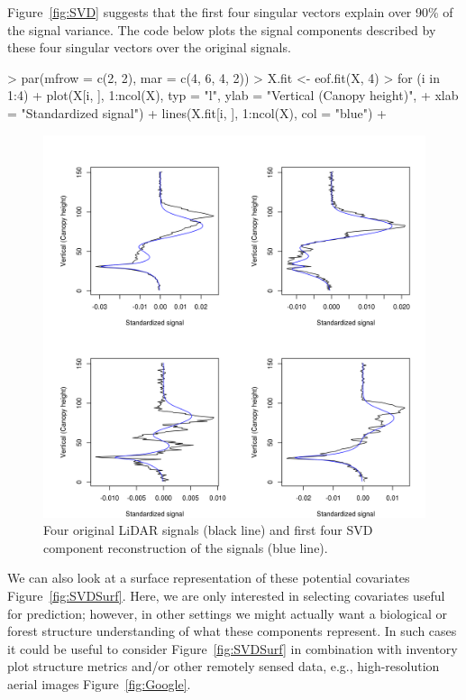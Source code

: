 \documentclass{article}
\begin{document}
Figure~\ref{fig:SVD} suggests that the first four singular vectors explain over 90\% of the signal variance. The code below plots the signal components described by these four singular vectors over the original signals.

\begin{Schunk}
\begin{Sinput}
> par(mfrow = c(2, 2), mar = c(4, 6, 4, 2))
> X.fit <- eof.fit(X, 4)
> for (i in 1:4) {
+     plot(X[i, ], 1:ncol(X), typ = "l", ylab = "Vertical (Canopy height)", 
+         xlab = "Standardized signal")
+     lines(X.fit[i, ], 1:ncol(X), col = "blue")
+ }
\end{Sinput}
\end{Schunk}

\begin{figure}
\begin{center}
\includegraphics[width=15cm]{figures/fig-SVDFitted}
\end{center}
\caption{Four original LiDAR signals (black line) and first four SVD component reconstruction of the signals (blue line).}
\label{fig:SVDFitted}
\end{figure}

We can also look at a surface representation of these potential covariates Figure~\ref{fig:SVDSurf}. Here, we are only interested in selecting covariates useful for prediction; however, in other settings we might actually want a biological or forest structure understanding of what these components represent. In such cases it could be useful to consider Figure~\ref{fig:SVDSurf} in combination with inventory plot structure metrics and/or other remotely sensed data, e.g., high-resolution aerial images Figure~\ref{fig:Google}.
\end{document}
